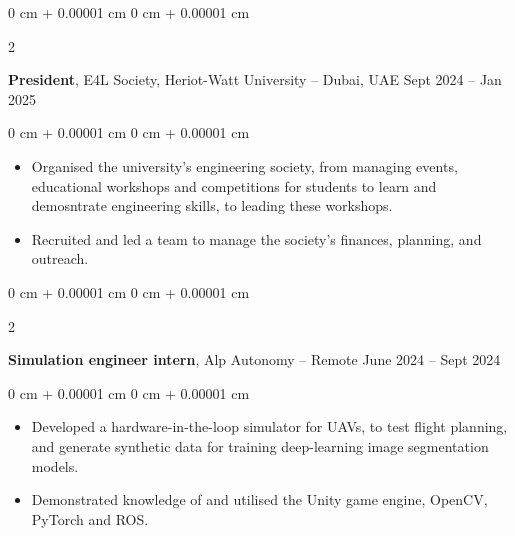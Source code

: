 \documentclass[10pt, letterpaper]{article}
\newenvironment{highlights}{
    \begin{itemize}[
        topsep=0.10 cm,
        parsep=0.10 cm,
        partopsep=0pt,
        itemsep=0pt,
        leftmargin=0 cm + 10pt
    ]
}{
    \end{itemize}
} %
\newenvironment{onecolentry}{
    \begin{adjustwidth}{
        0 cm + 0.00001 cm
    }{
        0 cm + 0.00001 cm
    }
}{
    \end{adjustwidth}
} %
\newenvironment{twocolentry}[2][]{
    \onecolentry
    \def\secondColumn{#2}
    \setcolumnwidth{\fill, 4.5 cm}
    \begin{paracol}{2}
}{
    \switchcolumn \raggedleft \secondColumn
    \end{paracol}
    \endonecolentry
} %
\begin{document}
        \vspace{0.2 cm}
        \begin{twocolentry}{
            Sept 2024 – Jan 2025
        }
            \textbf{President}, E4L Society, Heriot-Watt University -- Dubai, UAE\end{twocolentry}

        \vspace{0.10 cm}
        \begin{onecolentry}
            \begin{highlights}
                \item Organised the university’s engineering society, from managing events, educational workshops and competitions for students to learn and demosntrate engineering skills, to leading these workshops. 
                \item Recruited and led a team to manage the society's finances, planning, and outreach.
            \end{highlights}
        \end{onecolentry}

        \vspace{0.2 cm}

        \begin{twocolentry}{
            June 2024 – Sept 2024
        }
            \textbf{Simulation engineer intern}, Alp Autonomy -- Remote\end{twocolentry}

        \vspace{0.10 cm}
        \begin{onecolentry}
            \begin{highlights}
                \item Developed a hardware-in-the-loop simulator for UAVs, to test flight planning, and generate synthetic data for training deep-learning image segmentation models.
                \item Demonstrated knowledge of and utilised the Unity game engine, OpenCV, PyTorch and ROS.
            \end{highlights}
        \end{onecolentry}
\end{document}
